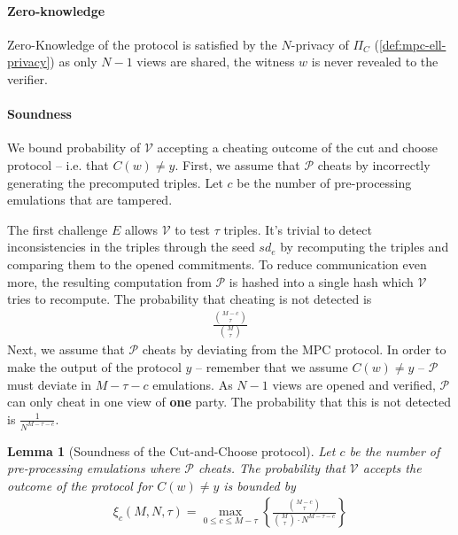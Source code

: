 \documentclass[11pt]{report}
\theoremstyle{definition}
\theoremstyle{plain}
\newtheorem{lemma}{Lemma}[section]
\begin{document}
\paragraph{Zero-knowledge}

Zero-Knowledge of the protocol is satisfied by the $N$-privacy of $\Pi_C$ (\autoref{def:mpc-ell-privacy}) as only $N-1$ views are shared, the witness $w$ is never revealed to the verifier.

\paragraph{Soundness}

We bound probability of $\mathcal{V}$ accepting a cheating outcome of  the cut and choose protocol -- i.e. that $C(w) \neq y$. First, we assume that $\mathcal{P}$ cheats by incorrectly generating the precomputed triples. Let $c$ be the number of pre-processing emulations that are tampered.

The first challenge $E$ allows $\mathcal{V}$ to test $\tau$ triples. It's trivial to detect inconsistencies in the triples through the seed $sd_e$ by recomputing the triples and comparing them to the opened commitments. To reduce communication even more, the resulting computation from $\mathcal{P}$ is hashed into a single hash which $\mathcal{V}$ tries to recompute. The probability that cheating is not detected is
\begin{align*}
  \frac{\binom{M-c}{\tau}}{\binom{M}{\tau}}
\end{align*}
Next, we assume that $\mathcal{P}$ cheats by deviating from the MPC protocol. In order to make the output of the protocol $y$ -- remember that we assume $C(w) \neq y$ -- $\mathcal{P}$ must deviate in $M-\tau-c$ emulations. As $N-1$ views are opened and verified, $\mathcal{P}$ can only cheat in one view of \textbf{one} party. The probability that this is not detected is $\frac{1}{N^{M-\tau-c}}$.

\begin{lemma}[Soundness of the Cut-and-Choose protocol]\label{lem:cut-and-choose-soundness}
  Let $c$ be the number of pre-processing emulations where $\mathcal{P}$ cheats. The probability that $\mathcal{V}$ accepts the outcome of the protocol for $C(w) \neq y$ is bounded by
  \begin{align*}
    \xi_c(M, N, \tau) = \max_{0 \leq c \leq M-\tau} \left\{\frac{\binom{M-c}{\tau}}{\binom{M}{\tau} \cdot N^{M-\tau-c}} \right\}
  \end{align*}
\end{lemma}
\end{document}
